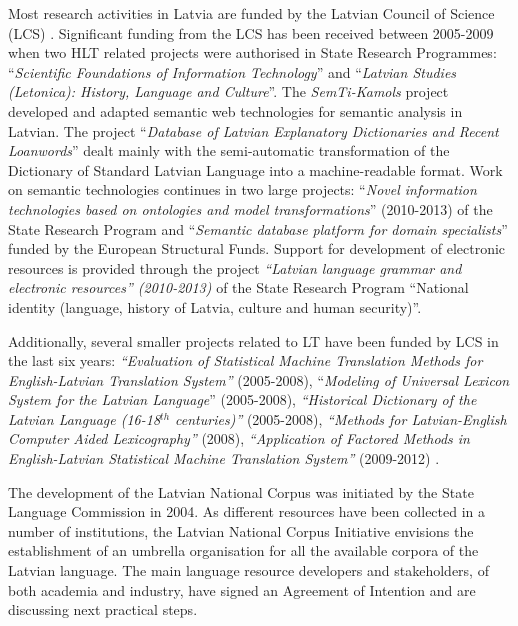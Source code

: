 \begin{multicols}{2}
Most research activities in Latvia are funded by the Latvian Council of Science (LCS) \cite{Meta2}.
Significant funding from the LCS has been received between 2005-2009 when two HLT related projects were authorised in State Research Programmes: ``\textit{Scientific Foundations of Information Technology}'' and ``\textit{Latvian Studies (Letonica): History, Language and Culture}''.
The \textit{SemTi-Kamols} project \cite{Meta39} developed and adapted semantic web technologies for semantic analysis in Latvian.
The project ``\textit{Database of Latvian Explanatory Dictionaries and Recent Loanwords}'' dealt mainly with the semi-automatic transformation of the Dictionary of Standard Latvian Language into a machine-readable format.
Work on semantic technologies continues in two large projects: ``\textit{Novel information technologies based on ontologies and model transformations}'' (2010-2013) of the State Research Program and ``\textit{Semantic database platform for domain specialists}'' funded by the European Structural Funds.
Support for development of electronic resources is provided through the project \textit{``Latvian language grammar and electronic resources'' (2010-2013)} of the State Research Program ``National identity (language, history of Latvia, culture and human security)''. 

Additionally, several smaller projects related to LT have been funded by LCS in the last six years: \textit{``Evaluation of Statistical Machine Translation Methods for English-Latvian Translation System''} (2005-2008), ``\textit{Modeling of Universal Lexicon System for the Latvian Language}'' (2005-2008), \textit{``Historical Dictionary of the Latvian Language (16-18${}^{th}$ centuries)''} (2005-2008), \textit{``Methods for Latvian-English Computer Aided Lexicography''} (2008), \textit{``Application of Factored Methods in English-Latvian Statistical Machine Translation System''} (2009-2012) \cite{Meta27}.

The development of the Latvian National Corpus was initiated by the State Language Commission in 2004.
As different resources have been collected in a number of institutions, the Latvian National Corpus Initiative envisions the establishment of an umbrella organisation for all the available corpora of the Latvian language.
The main language resource developers and stakeholders, of both academia and industry, have signed an Agreement of Intention and are discussing next practical steps.


\end{multicols}
